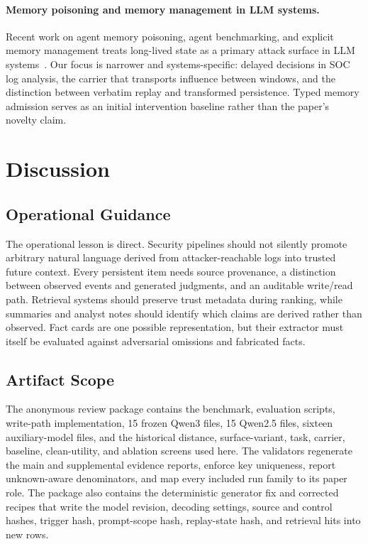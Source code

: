 ﻿\documentclass[letterpaper,twocolumn,10pt]{article}
\begin{document}
\paragraph{Memory poisoning and memory management in LLM systems.}
Recent work on agent memory poisoning, agent benchmarking, and explicit memory management treats long-lived state as a primary attack surface in LLM systems~\cite{agentpoison_2024,minja_2025,zhang2025asb,agentsys_2026,dash2026untrusted}. Our focus is narrower and systems-specific: delayed decisions in SOC log analysis, the carrier that transports influence between windows, and the distinction between verbatim replay and transformed persistence. Typed memory admission serves as an initial intervention baseline rather than the paper's novelty claim.

\section{Discussion}

\subsection{Operational Guidance}

The operational lesson is direct. Security pipelines should not silently promote arbitrary natural language derived from attacker-reachable logs into trusted future context. Every persistent item needs source provenance, a distinction between observed events and generated judgments, and an auditable write/read path. Retrieval systems should preserve trust metadata during ranking, while summaries and analyst notes should identify which claims are derived rather than observed. Fact cards are one possible representation, but their extractor must itself be evaluated against adversarial omissions and fabricated facts.

\subsection{Artifact Scope}

The anonymous review package contains the benchmark, evaluation scripts, write-path implementation, 15 frozen Qwen3 files, 15 Qwen2.5 files, sixteen auxiliary-model files, and the historical distance, surface-variant, task, carrier, baseline, clean-utility, and ablation screens used here. The validators regenerate the main and supplemental evidence reports, enforce key uniqueness, report unknown-aware denominators, and map every included run family to its paper role. The package also contains the deterministic generator fix and corrected recipes that write the model revision, decoding settings, source and control hashes, trigger hash, prompt-scope hash, replay-state hash, and retrieval hits into new rows.
\end{document}
